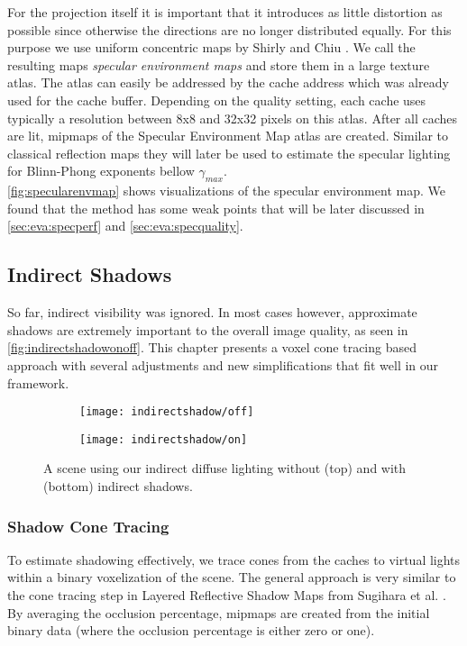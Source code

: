 \documentclass[thesis.tex]{subfiles}
\begin{document}
For the projection itself it is important that it introduces as little distortion as possible since otherwise the directions are no longer distributed equally.
For this purpose we use uniform concentric maps by Shirly and Chiu \cite{bib:concentricmaps}.
We call the resulting maps \emph{specular environment maps} and store them in a large texture atlas.
The atlas can easily be addressed by the cache address which was already used for the cache buffer.
Depending on the quality setting, each cache uses typically a resolution between 8x8 and 32x32 pixels on this atlas.
After all caches are lit, mipmaps of the Specular Environment Map atlas are created.
Similar to classical reflection maps \cite[p.~308]{bib:RealtimeRenderingBook} they will later be used to estimate the specular lighting for Blinn-Phong exponents bellow $\gamma_{max}$.
\\
\autoref{fig:specularenvmap} shows visualizations of the specular environment map.
We found that the method has some weak points that will be later discussed in \autoref{sec:eva:specperf} and \autoref{sec:eva:specquality}.


\subsection{Indirect Shadows} \label{sec:main:shadowing}
So far, indirect visibility was ignored.
In most cases however, approximate shadows are extremely important to the overall image quality, as seen in \autoref{fig:indirectshadowonoff}.
This chapter presents a voxel cone tracing based approach with several adjustments and new simplifications that fit well in our framework.
\begin{figure}[h!]
\centering
\begin{subfigure}[b]{\textwidth}
	\texttt{[image: indirectshadow/off]}
\end{subfigure}

\vspace{8pt}
\begin{subfigure}[b]{\textwidth}
	\texttt{[image: indirectshadow/on]}
\end{subfigure}
\caption{A scene using our indirect diffuse lighting without (top) and with (bottom) indirect shadows.}
\label{fig:indirectshadowonoff}
\end{figure}

\subsubsection{Shadow Cone Tracing}\label{sec:impl:voxelization}
To estimate shadowing effectively, we trace cones from the caches to virtual lights within a binary voxelization of the scene.
The general approach is very similar to the cone tracing step in Layered Reflective Shadow Maps from Sugihara et al. \cite{bib:layeredrsm}. %
By averaging the occlusion percentage, mipmaps are created from the initial binary data (where the occlusion percentage is either zero or one).
\end{document}
